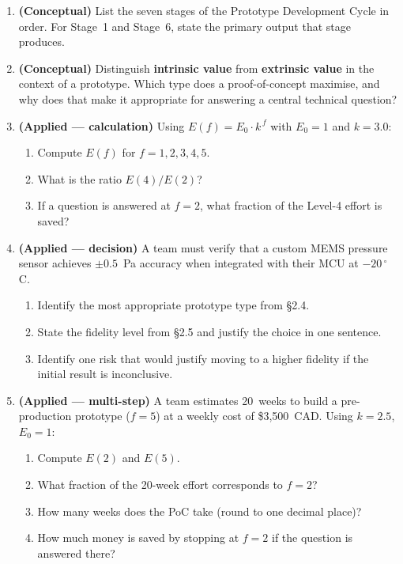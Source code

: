 \begin{enumerate}

  \item \textbf{(Conceptual)} List the seven stages of the Prototype Development
  Cycle in order. For Stage~1 and Stage~6, state the primary output that stage
  produces.

  \item \textbf{(Conceptual)} Distinguish \textbf{intrinsic value} from
  \textbf{extrinsic value} in the context of a prototype. Which type does a
  proof-of-concept maximise, and why does that make it appropriate for answering
  a central technical question?

  \item \textbf{(Applied --- calculation)} Using $E(f) = E_0 \cdot k^{\,f}$ with
  $E_0 = 1$ and $k = 3.0$:
  \begin{enumerate}
    \item Compute $E(f)$ for $f = 1, 2, 3, 4, 5$.
    \item What is the ratio $E(4)/E(2)$?
    \item If a question is answered at $f = 2$, what fraction of the Level-4
          effort is saved?
  \end{enumerate}

  \item \textbf{(Applied --- decision)} A team must verify that a custom MEMS
  pressure sensor achieves $\pm 0.5$~Pa accuracy when integrated with their
  MCU at $-20\,^{\circ}$C.
  \begin{enumerate}
    \item Identify the most appropriate prototype type from \S2.4.
    \item State the fidelity level from \S2.5 and justify the choice in one
          sentence.
    \item Identify one risk that would justify moving to a higher fidelity if
          the initial result is inconclusive.
  \end{enumerate}

  \item \textbf{(Applied --- multi-step)} A team estimates 20~weeks to build a
  pre-production prototype ($f = 5$) at a weekly cost of \$3{,}500~CAD.
  Using $k = 2.5$, $E_0 = 1$:
  \begin{enumerate}
    \item Compute $E(2)$ and $E(5)$.
    \item What fraction of the 20-week effort corresponds to $f = 2$?
    \item How many weeks does the PoC take (round to one decimal place)?
    \item How much money is saved by stopping at $f = 2$ if the question is
          answered there?
  \end{enumerate}

\end{enumerate}

